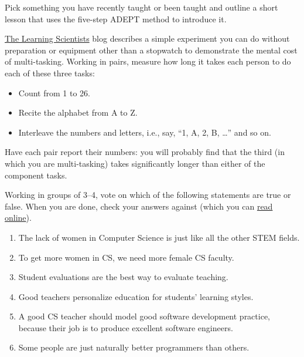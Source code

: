 Pick something you have recently taught or been taught and outline a
short lesson that uses the five-step ADEPT method to introduce it.


\href{http://www.learningscientists.org/blog/2017/7/28-1}{The Learning
  Scientists} blog describes a simple experiment you can do without
preparation or equipment other than a stopwatch to demonstrate the
mental cost of multi-tasking.  Working in pairs, measure how long it
takes each person to do each of these three tasks:

\begin{itemize}

\item
  Count from 1 to 26.

\item
  Recite the alphabet from A to Z.

\item
  Interleave the numbers and letters, i.e., say, ``1, A, 2, B,
  {\ldots}'' and so on.

\end{itemize}

Have each pair report their numbers: you will probably find that the
third (in which you are multi-tasking) takes significantly longer than
either of the component tasks.


Working in groups of 3--4, vote on which of the following statements
are true or false.  When you are done, check your answers against
\cite{Guzd2015b} (which you can
\href{https://cacm.acm.org/blogs/blog-cacm/189498-top-10-myths-about-teaching-computer-science/fulltext}{read
  online}).

\begin{enumerate}

\item The lack of women in Computer Science is just like all the other
  STEM fields.

\item To get more women in CS, we need more female CS faculty.

\item Student evaluations are the best way to evaluate teaching.

\item Good teachers personalize education for students' learning
  styles.

\item A good CS teacher should model good software development
  practice, because their job is to produce excellent software
  engineers.

\item Some people are just naturally better programmers than others.

\end{enumerate}

